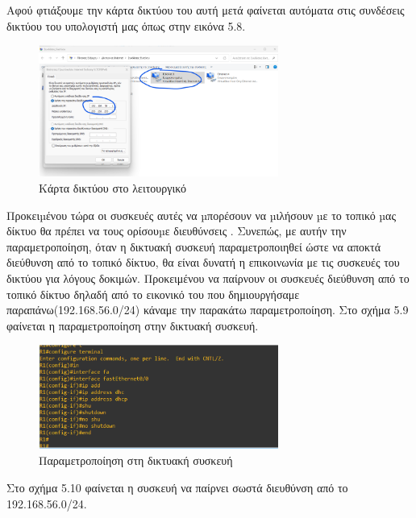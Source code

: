 \noindent Αφού φτιάξουμε την κάρτα δικτύου του  αυτή μετά φαίνεται αυτόματα στις συνδέσεις δικτύου του υπολογιστή μας όπως στην εικόνα 5.8.

\FloatBarrier

\begin{figure}[htb]
	\centering
	\includegraphics[width=0.7\textwidth]{graphics/windows_host_networking.png}
	\caption{Κάρτα δικτύου στο  λειτουργικό}
\end{figure}

\FloatBarrier

Προκειµένου τώρα οι συσκευές αυτές να µπορέσουν να µιλήσουν µε το τοπικό µας δίκτυο θα πρέπει να τους ορίσουµε  διευθύνσεις . Συνεπώς, με αυτήν την παραμετροποίηση, όταν η δικτυακή συσκευή παραμετροποιηθεί ώστε να αποκτά  διεύθυνση από το τοπικό δίκτυο, θα είναι δυνατή η επικοινωνία με τις συσκευές του δικτύου για λόγους δοκιμών.
Προκειμένου να παίρνουν οι συσκευές  διεύθυνση από το τοπικό δίκτυο δηλαδή από το εικονικό  του  που δημιουργήσαμε παραπάνω(192.168.56.0/24) κάναμε την παρακάτω παραμετροποίηση.
Στο σχήμα 5.9 φαίνεται η παραμετροποίηση στην δικτυακή συσκευή.

\FloatBarrier

\begin{figure}[htb]
	\centering
	\includegraphics[width=0.7\textwidth]{graphics/cisco_ssh_config_2.png}
	\caption{Παραμετροποίηση στη δικτυακή συσκευή}
\end{figure}

\FloatBarrier

\noindent Στο σχήμα 5.10 φαίνεται η συσκευή να παίρνει σωστά  διευθύνση από το 192.168.56.0/24.

